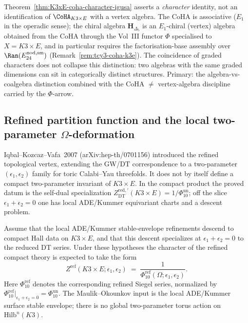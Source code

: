 \begin{remark}
\label{rem:K3xE-coha-chiral-guard}
Theorem~\ref{thm:K3xE-coha-character-igusa} asserts a \emph{character}
identity, not an identification of $\CoHA_{K3 \times E}$ with a vertex
algebra. The CoHA is associative ($E_1$ in the operadic sense); the
chiral algebra $\mathbf{H}_{\Delta_5}$ is an $E_1$-chiral (vertex)
algebra obtained from the CoHA through the Vol~III functor $\Phi$
specialised to $X = K3 \times E$, and in particular requires the
factorisation-base assembly over $\Ran(E^{\mathrm{nod,sm}}_{24})$
(Remark~\ref{rem:tcy3-coha-k3e}). The coincidence of graded
characters does not collapse this distinction: two algebras with the
same graded dimensions can sit in categorically distinct structures.
Primary: the algebra-vs-coalgebra distinction combined with the
CoHA $\neq$ vertex-algebra discipline carried by the $\Phi$-arrow.
\end{remark}

\subsection{Refined partition function and the local two-parameter
\texorpdfstring{$\Omega$}{Omega}-deformation}
\label{subsec:K3xE-refined}

Iqbal--Kozcaz--Vafa~2007 (arXiv:hep-th/0701156) introduced the refined
topological vertex, extending the GW/DT correspondence to a
two-parameter $(\epsilon_1, \epsilon_2)$ family for toric
Calabi--Yau threefolds. It does not by itself define a compact
two-parameter invariant of \(K3\times E\). In the compact product the
proved datum is the self-dual specialization
\(Z^{\mathrm{red},\prime}_{\mathrm{DT}}(K3\times E)=1/\Phi_{10}^{\mathrm{un}}\);
off the slice \(\epsilon_1+\epsilon_2=0\) one has local
ADE/Kummer equivariant charts and a descent problem.

\begin{conjecture}
\label{conj:K3xE-refined-family}
\ClaimStatusConjectured
Assume that the local ADE/Kummer stable-envelope refinements descend
to compact Hall data on \(K3\times E\), and that this descent
specializes at \(\epsilon_1+\epsilon_2=0\) to the reduced DT series.
Under these hypotheses the character of the refined compact theory is
expected to take the form
\[
 Z^{\mathrm{ref}}(K3 \times E; \epsilon_1, \epsilon_2)
 \;=\; \frac{1}{\Phi_{10}^{\mathrm{ref}}(\Omega; \epsilon_1, \epsilon_2)}.
\]
Here \(\Phi_{10}^{\mathrm{ref}}\) denotes the corresponding refined
Siegel series, normalized by
\(\Phi_{10}^{\mathrm{ref}}|_{\epsilon_1+\epsilon_2=0}
=\Phi_{10}^{\mathrm{un}}\). The Maulik--Okounkov input is the local
ADE/Kummer surface stable envelope; there is no global two-parameter
torus action on \(\mathrm{Hilb}^n(K3)\).
\end{conjecture}

